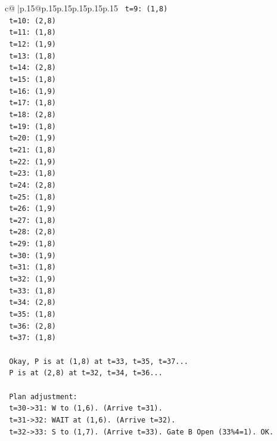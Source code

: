 \documentclass{article}
\begin{document}
{\begin{supertabular}{c@{$\;$}|p{.15\linewidth}@{}p{.15\linewidth}p{.15\linewidth}p{.15\linewidth}p{.15\linewidth}p{.15\linewidth}}
{{{\texttt{   t=9: (1,8)} \\
\texttt{   t=10: (2,8)} \\
\texttt{   t=11: (1,8)} \\
\texttt{   t=12: (1,9)} \\
\texttt{   t=13: (1,8)} \\
\texttt{   t=14: (2,8)} \\
\texttt{   t=15: (1,8)} \\
\texttt{   t=16: (1,9)} \\
\texttt{   t=17: (1,8)} \\
\texttt{   t=18: (2,8)} \\
\texttt{   t=19: (1,8)} \\
\texttt{   t=20: (1,9)} \\
\texttt{   t=21: (1,8)} \\
\texttt{   t=22: (1,9)} \\
\texttt{   t=23: (1,8)} \\
\texttt{   t=24: (2,8)} \\
\texttt{   t=25: (1,8)} \\
\texttt{   t=26: (1,9)} \\
\texttt{   t=27: (1,8)} \\
\texttt{   t=28: (2,8)} \\
\texttt{   t=29: (1,8)} \\
\texttt{   t=30: (1,9)} \\
\texttt{   t=31: (1,8)} \\
\texttt{   t=32: (1,9)} \\
\texttt{   t=33: (1,8)} \\
\texttt{   t=34: (2,8)} \\
\texttt{   t=35: (1,8)} \\
\texttt{   t=36: (2,8)} \\
\texttt{   t=37: (1,8)} \\
\\ 
\texttt{   Okay, P is at (1,8) at t=33, t=35, t=37...} \\
\texttt{   P is at (2,8) at t=32, t=34, t=36...} \\
\\ 
\texttt{   Plan adjustment:} \\
\texttt{   t=30{-}>31: W to (1,6). (Arrive t=31).} \\
\texttt{   t=31{-}>32: WAIT at (1,6). (Arrive t=32).} \\
\texttt{   t=32{-}>33: S to (1,7). (Arrive t=33). Gate B Open (33\%4=1). OK.} \\
}}}
\end{supertabular}}
\end{document}
